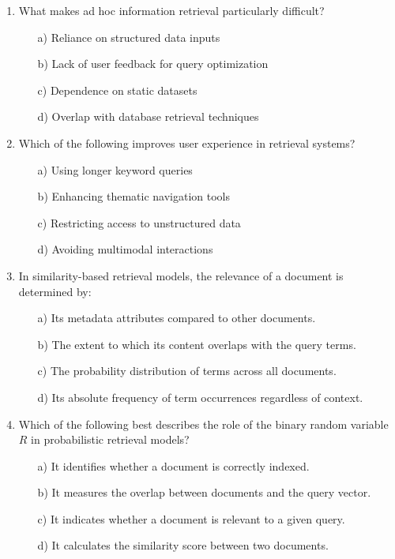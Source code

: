 \documentclass[8pt]{extarticle}
\begin{document}
\begin{multicols}{2}
\begin{enumerate}
\item What makes ad hoc information retrieval particularly difficult?
\begin{itemize}
    \item[a)] Reliance on structured data inputs
    \item[b)] Lack of user feedback for query optimization
    \item[c)] Dependence on static datasets
    \item[d)] Overlap with database retrieval techniques
\end{itemize}

\item Which of the following improves user experience in retrieval systems?
\begin{itemize}
    \item[a)] Using longer keyword queries
    \item[b)] Enhancing thematic navigation tools
    \item[c)] Restricting access to unstructured data
    \item[d)] Avoiding multimodal interactions
\end{itemize}

\item In similarity-based retrieval models, the relevance of a document is determined by:
\begin{itemize}
    \item[a)] Its metadata attributes compared to other documents.
    \item[b)] The extent to which its content overlaps with the query terms.
    \item[c)] The probability distribution of terms across all documents.
    \item[d)] Its absolute frequency of term occurrences regardless of context.
\end{itemize}

\item Which of the following best describes the role of the binary random variable $R$ in probabilistic retrieval models?
\begin{itemize}
    \item[a)] It identifies whether a document is correctly indexed.
    \item[b)] It measures the overlap between documents and the query vector.
    \item[c)] It indicates whether a document is relevant to a given query.
    \item[d)] It calculates the similarity score between two documents.
\end{itemize}


\end{enumerate}
\end{multicols}
\end{document}

